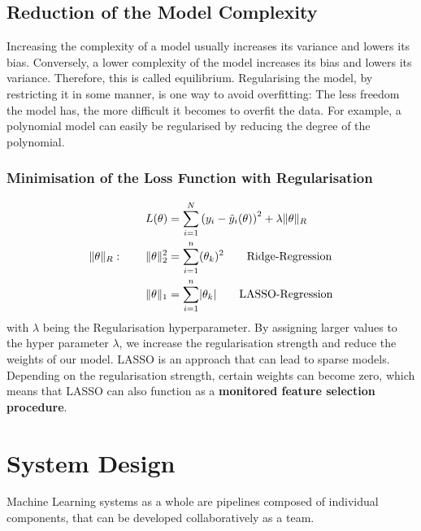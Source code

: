 \documentclass[11pt]{article}
\theoremstyle{definition}
\DeclarePairedDelimiter\abs{\lvert}{\rvert}
\DeclarePairedDelimiter\norm{\lVert}{\rVert}
\begin{document}
\subsection{Reduction of the Model Complexity}
Increasing the complexity of a model usually increases its variance and lowers its bias. Conversely, a lower complexity of the model increases its bias and lowers its variance. Therefore, this is called equilibrium. Regularising the model, by restricting it in some manner, is one way to avoid overfitting: The less freedom the model has, the more difficult it becomes to overfit the data. For example, a polynomial model can easily be regularised by reducing the degree of the polynomial.

\subsubsection{Minimisation of the Loss Function with Regularisation}
\begin{align*}
	L(\theta) &= \sum_{i=1}^{N} \left( y_i - \hat{y}_i(\theta) \right)^2 + \lambda \norm{\theta}_R\\
	\norm{\theta}_R:\qquad \norm{\theta}_2^2 &= \sum_{i=1}^{n} (\theta_k)^2\qquad \text{Ridge-Regression}\\
	\norm{\theta}_1 &= \sum_{i=1}^{n} \abs{\theta_k}\qquad \text{LASSO-Regression}\\
\end{align*}
with $\lambda$ being the Regularisation hyperparameter. By assigning larger values to the hyper parameter $\lambda$, we increase the regularisation strength and reduce the weights of our model. LASSO is an approach that can lead to sparse models. Depending on the regularisation strength, certain weights can become zero, which means that LASSO can also function as a \textbf{monitored feature selection procedure}.

\section{System Design}
Machine Learning systems as a whole are pipelines composed of individual components, that can be developed collaboratively as a team.
\end{document}
